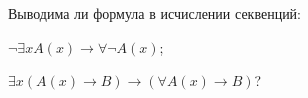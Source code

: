 Выводима ли формула в исчислении секвенций:
\begin{enumcyr}
    \item $\neg \exists x A(x) \to \forall \neg A(x)$;
    \item $\exists x (A(x) \to B) \to (\forall A(x) \to B)$?
\end{enumcyr}

